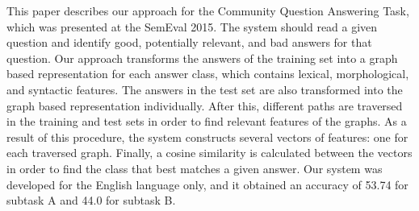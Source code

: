 This paper describes our approach for the Community Question Answering Task, which was presented at the SemEval 2015. The system should read a given question and identify good, potentially relevant, and bad answers for that question. Our approach transforms the answers of the training set into a graph based representation for each answer class, which contains lexical, morphological, and syntactic features. The answers in the test set are also transformed into the graph based representation individually. After this, different paths are traversed in the training and test sets in order to find relevant features of the graphs. As a result of this procedure, the system constructs several vectors of features: one for each traversed graph. Finally, a cosine  similarity is calculated between the vectors in order to find the class that best matches a given answer. Our system was developed for the English language only, and it obtained an accuracy of 53.74 for subtask A and 44.0 for subtask B.
